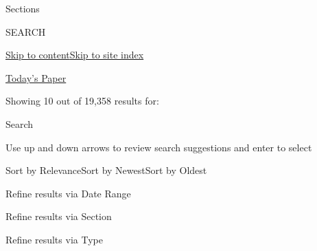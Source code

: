 Sections

SEARCH

\protect\hyperlink{site-content}{Skip to
content}\protect\hyperlink{site-index}{Skip to site index}

\href{https://myaccount.nytimes.com/auth/login?response_type=cookie\&client_id=vi}{}

\href{https://www.nytimes.com/section/todayspaper}{Today's Paper}

Showing 10 out of 19,358 results for:

Search

Use up and down arrows to review search suggestions and enter to select

Sort by RelevanceSort by NewestSort by Oldest

Refine results via Date Range

Refine results via Section

Refine results via Type

